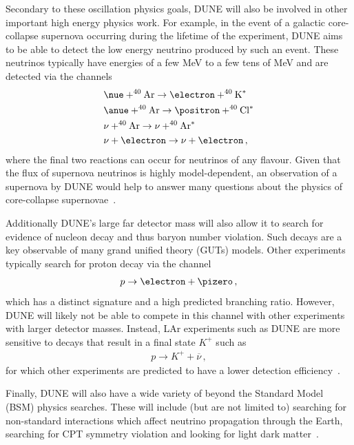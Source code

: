 Secondary to these oscillation physics goals, DUNE will also be involved in other important high energy physics work.
For example, in the event of a galactic core-collapse supernova occurring during the lifetime of the experiment, DUNE aims to be able to detect the low energy neutrino produced by such an event.
These neutrinos typically have energies of a few \si{\mega\electronvolt} to a few tens of \si{\mega\electronvolt} and are detected via the channels
\begin{align}
  &\nue + ^{40}\text{Ar} \rightarrow \electron + ^{40}\text{K}^{*} \\
  &\anue + ^{40}\text{Ar} \rightarrow \positron + ^{40}\text{Cl}^{*} \\
  &\nu + ^{40}\text{Ar} \rightarrow \nu + ^{40}\text{Ar}^{*} \\
  &\nu + \electron \rightarrow \nu + \electron \, ,
\end{align}
where the final two reactions can occur for neutrinos of any flavour.
Given that the flux of supernova neutrinos is highly model-dependent, an observation of a supernova by DUNE would help to answer many questions about the physics of core-collapse supernovae~\cite{duneSupernova}. 

Additionally DUNE's large far detector mass will also allow it to search for evidence of nucleon decay and thus baryon number violation.
Such decays are a key observable of many grand unified theory (GUTs) models.
Other experiments typically search for proton decay via the channel
\begin{align}
  p \rightarrow \electron + \pizero \, ,
\end{align}
which has a distinct signature and a high predicted branching ratio.
However, DUNE will likely not be able to compete in this channel with other experiments with larger detector masses.
Instead, LAr experiments such as DUNE are more sensitive to decays that result in a final state $K^{+}$ such as 
\begin{align}
  p \rightarrow K^{+} + \overline{\nu} \, ,
\end{align}
for which other experiments are predicted to have a lower detection efficiency~\cite{duneBSM}.

Finally, DUNE will also have a wide variety of beyond the Standard Model (BSM) physics searches.
These will include (but are not limited to) searching for non-standard interactions which affect neutrino propagation through the Earth, searching for CPT symmetry violation and looking for light dark matter~\cite{duneBSM}.

